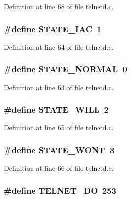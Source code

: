 Definition at line 68 of file telnetd.c.

\hypertarget{group__telnetd_ga19709735f29dafeabb91e0882231f9f1}{
\subsubsection[{STATE\_\-IAC}]{\setlength{\rightskip}{0pt plus 5cm}\#define STATE\_\-IAC~1}}
\label{group__telnetd_ga19709735f29dafeabb91e0882231f9f1}


Definition at line 64 of file telnetd.c.

\hypertarget{group__telnetd_gae429c985be88ed048f382511c9ff00de}{
\subsubsection[{STATE\_\-NORMAL}]{\setlength{\rightskip}{0pt plus 5cm}\#define STATE\_\-NORMAL~0}}
\label{group__telnetd_gae429c985be88ed048f382511c9ff00de}


Definition at line 63 of file telnetd.c.

\hypertarget{group__telnetd_ga7e904ab59f7ee134cf3218a8219e7e29}{
\subsubsection[{STATE\_\-WILL}]{\setlength{\rightskip}{0pt plus 5cm}\#define STATE\_\-WILL~2}}
\label{group__telnetd_ga7e904ab59f7ee134cf3218a8219e7e29}


Definition at line 65 of file telnetd.c.

\hypertarget{group__telnetd_ga5025948dd998f65a13a375a37aa5edf5}{
\subsubsection[{STATE\_\-WONT}]{\setlength{\rightskip}{0pt plus 5cm}\#define STATE\_\-WONT~3}}
\label{group__telnetd_ga5025948dd998f65a13a375a37aa5edf5}


Definition at line 66 of file telnetd.c.

\hypertarget{group__telnetd_gaf784a76fe619452eddf87e6376a4bf9d}{
\subsubsection[{TELNET\_\-DO}]{\setlength{\rightskip}{0pt plus 5cm}\#define TELNET\_\-DO~253}}
\label{group__telnetd_gaf784a76fe619452eddf87e6376a4bf9d}


